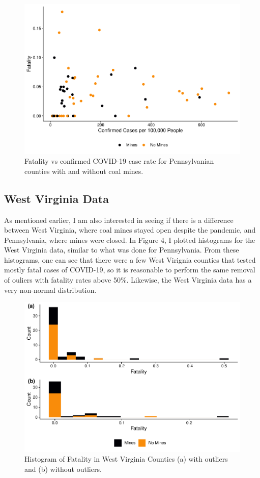 \documentclass[
  12pt,
]{article}
\begin{document}
\begin{figure}
\centering
\includegraphics{Hancock_ENV872_Project_files/figure-latex/PA Fatality vs Case Rate-1.pdf}
\caption{Fatality vs confirmed COVID-19 case rate for Pennsylvanian
counties with and without coal mines.}
\end{figure}

\hypertarget{west-virginia-data}{%
\subsection{West Virginia Data}\label{west-virginia-data}}

As mentioned earlier, I am also interested in seeing if there is a
difference between West Virginia, where coal mines stayed open despite
the pandemic, and Pennsylvania, where mines were closed. In Figure 4, I
plotted histograms for the West Virginia data, similar to what was done
for Pennsylvania. From these histograms, one can see that there were a
few West Virignia counties that tested mostly fatal cases of COVID-19,
so it is reasonable to perform the same removal of ouliers with fatality
rates above 50\%. Likewise, the West Virginia data has a very non-normal
distribution.

\begin{figure}
\centering
\includegraphics{Hancock_ENV872_Project_files/figure-latex/WV Histograms-1.pdf}
\caption{Histogram of Fatality in West Virginia Counties (a) with
outliers and (b) without outliers.}
\end{figure}
\end{document}
